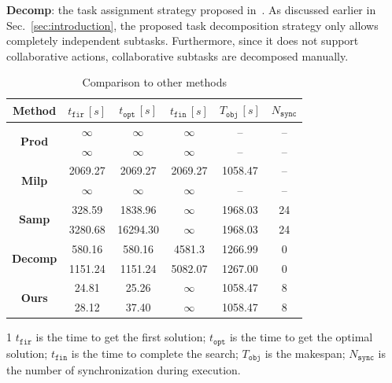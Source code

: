\textbf{Decomp}: the task assignment strategy proposed
in~\citep{schillinger2018simultaneous}.
As discussed earlier in Sec.~\ref{sec:introduction},
the proposed task decomposition strategy only allows completely
independent subtasks.
Furthermore, since it does not support collaborative actions,
collaborative subtasks are decomposed manually.
\begin{table}
  \centering
	\caption{Comparison to other methods}
	\label{table:compare_time}
        \footnotesize
	\begin{tabular}{|c|c|c|c|c|c|}\hline
	   Method &  $t_{\texttt{fir}}\, [s]$
          &  $t_{\texttt{opt}}\, [s]$
	  &  $t_{\texttt{fin}}\,[s]$ & $T_{\texttt{obj}}\,[s]$
          &  $N_{\texttt{sync}}$ \\ \hline
		\multirow{2}{*}{\textbf{Prod}}& $\infty$ & $\infty$ & $\infty$ & -- & -- \\
                 & $\infty$ & $\infty$ & $\infty$ & -- & -- \\
                \hline
		\multirow{2}{*}{\textbf{Milp}} & 2069.27 & 2069.27 & 2069.27 & 1058.47 & -- \\
                &$\infty$ &$\infty$ & $\infty$ & -- & --  \\
                \hline
		\multirow{2}{*}{\textbf{Samp}} & 328.59 & 1838.96 & $\infty$ & 1968.03 & 24 \\
                 & 3280.68 &  16294.30 & $\infty$ & 1968.03 & 24 \\
                \hline
		\multirow{2}{*}{\textbf{Decomp}} & 580.16 & 580.16 & 4581.3 & 1266.99 & 0 \\
		 & 1151.24 & 1151.24 & 5082.07 & 1267.00 & 0 \\
                \hline
		\multirow{2}{*}{\textbf{Ours}} & 24.81 & 25.26 & $\infty$ & 1058.47 & 8 \\
                 & 28.12 & 37.40 & $\infty$ & 1058.47 & 8 \\
		\hline
	\end{tabular}
\begin{tablenotes}
	\item[1] $t_\texttt{fir}$ is the time to get the first solution; $t_\texttt{opt}$ is 
	the time to get the optimal solution; $t_\texttt{fin}$ is the time to complete the search; $T_\texttt{obj}$ is the makespan; $N_\texttt{sync}$ is the number of synchronization during execution.
\end{tablenotes}
\end{table}

